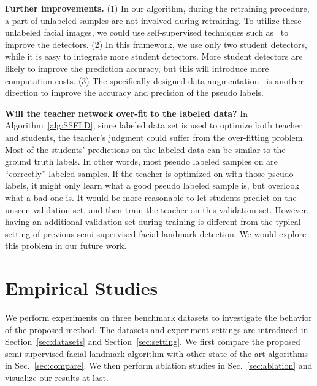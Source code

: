 \documentclass[10pt,twocolumn,letterpaper]{article}
\def\Secref#1{Section~\ref{#1}}
\def\Algref#1{Algorithm~\ref{#1}}
\begin{document}
\textbf{Further improvements.}
(1) In our algorithm, during the retraining procedure, a part of unlabeled samples are not involved during retraining.
To utilize these unlabeled facial images, we could use self-supervised techniques such as~\cite{honari2018improving} to improve the detectors.
(2) In this framework, we use only two student detectors, while it is easy to integrate more student detectors. More student detectors are likely to improve the prediction accuracy, but this will introduce more computation costs. 
(3) The specifically designed data augmentation~\cite{radosavovic2018data,wu2017facial} is another direction to improve the accuracy and precision of the pseudo labels.


\textbf{
Will the teacher network over-fit to the labeled data?
}
In \Algref{alg:SSFLD}, since labeled data set  is used to optimize both teacher and students, the teacher's judgment could suffer from the over-fitting problem.
Most of the students' predictions on the labeled data can be similar to the ground truth labels. In other words, most pseudo labeled samples on  are ``correctly'' labeled samples.
If the teacher is optimized on  with those pseudo labels, it might only learn what a good pseudo labeled sample is, but overlook what a bad one is.
It would be more reasonable to let students predict on the unseen validation set, and then train the teacher on this validation set.
However, having an additional validation set during training is different from the typical setting of previous semi-supervised facial landmark detection. We would explore this problem in our future work.











\section{Empirical Studies}\label{sec:experiments}

We perform experiments on three benchmark datasets to investigate the behavior of the proposed method.
The datasets and experiment settings are introduced in \Secref{sec:datasets} and \Secref{sec:setting}.
We first compare the proposed semi-supervised facial landmark algorithm with other state-of-the-art algorithms in Sec.~\ref{sec:compare}.
We then perform ablation studies in Sec.~\ref{sec:ablation} and visualize our results at last.
\end{document}
